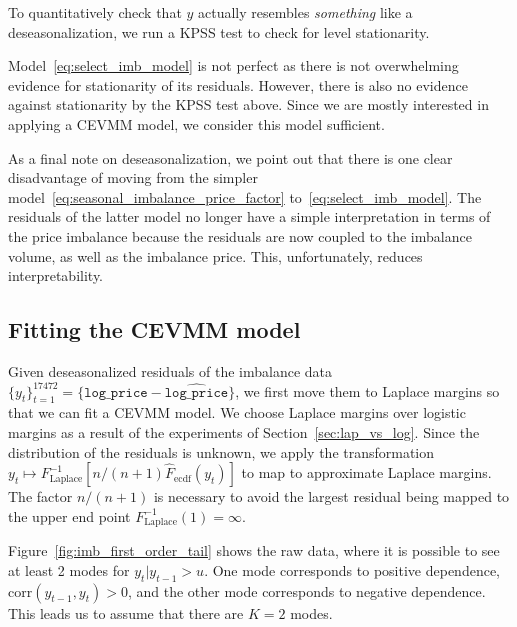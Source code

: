 \documentclass[11pt,twoside,openany]{book}
\newcommand{\code}[1]{\texttt{#1}}
\numberwithin{Theorem}{chapter}
\numberwithin{Definition}{chapter}
\numberwithin{Lemma}{chapter}
\numberwithin{Algorithm}{chapter}
\numberwithin{equation}{chapter}
\begin{document}
To quantitatively check that $y$
actually resembles {\it something} like a deseasonalization, we run a KPSS test
 to check for level stationarity.



Model~\eqref{eq:select_imb_model} is not perfect as
there is not overwhelming evidence for stationarity of its residuals.
However, there is also no evidence against stationarity by the KPSS test above.
Since we are mostly interested in applying a CEVMM model, we consider
this model sufficient.

As a final note on deseasonalization, we point out that there is one clear
disadvantage of moving from the simpler
model~\eqref{eq:seasonal_imbalance_price_factor}
to~\eqref{eq:select_imb_model}. The residuals of the latter model no longer
have a simple interpretation in terms of the price imbalance
because the residuals are now coupled to the imbalance volume, as well as
the imbalance price. This, unfortunately, reduces interpretability.

\subsection{Fitting the CEVMM model}

Given deseasonalized residuals of the imbalance data $\{y_t\}_{t=1}^{17472} =
\{\code{log_price} - \widehat{\code{log_price}}\}$,
we first move them to Laplace margins so that we can fit a CEVMM model.
We choose Laplace margins over logistic margins as a result of the experiments
of Section~\ref{sec:lap_vs_log}.
Since the distribution of the residuals is unknown, we apply
the transformation $y_t \mapsto F^{-1}_{\text{Laplace}}[n/(n+1)\hat F_{\text{ecdf}}(y_t)]$
to map to approximate Laplace margins. The factor $n/(n+1)$ is necessary to
avoid the largest residual being mapped to the upper end point $F_{\text{Laplace}}^{-1}(1) = \infty$.


Figure~\ref{fig:imb_first_order_tail} shows the raw data, where it is
possible to see at least 2 modes for $y_{t} | y_{t-1} > u$.
One mode corresponds to positive dependence, $\mathrm{corr}(y_{t-1},y_{t}) > 0$,
and the other mode corresponds to negative dependence. This leads us to assume that
there are $K=2$ modes.
\end{document}
